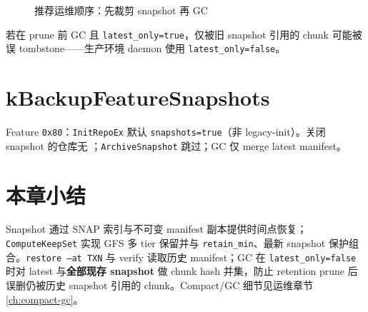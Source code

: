 \begin{figure}[htbp]
\centering
{}
\caption{推荐运维顺序：先裁剪 snapshot 再 GC}
\label{fig:prune-gc-order}
\end{figure}

若在 prune 前 GC 且 \texttt{latest\_only=true}，仅被旧 snapshot 引用的 chunk 可能被误 tombstone——生产环境 daemon 使用 \texttt{latest\_only=false}。

\section{kBackupFeatureSnapshots}

Feature \texttt{0x80}：\texttt{InitRepoEx} 默认 \texttt{snapshots=true}（非 legacy-init）。关闭 snapshot 的仓库无 ；\texttt{ArchiveSnapshot} 跳过；GC 仅 merge latest manifest。

\section{本章小结}

Snapshot 通过 SNAP 索引与不可变 manifest 副本提供时间点恢复；\texttt{ComputeKeepSet} 实现 GFS 多 tier 保留并与 \texttt{retain\_min}、最新 snapshot 保护组合。\texttt{restore --at TXN} 与 verify 读取历史 manifest；GC 在 \texttt{latest\_only=false} 时对 latest 与\textbf{全部现存 snapshot} 做 chunk hash 并集，防止 retention prune 后误删仍被历史 snapshot 引用的 chunk。Compact/GC 细节见运维章节 \cref{ch:compact-gc}。

